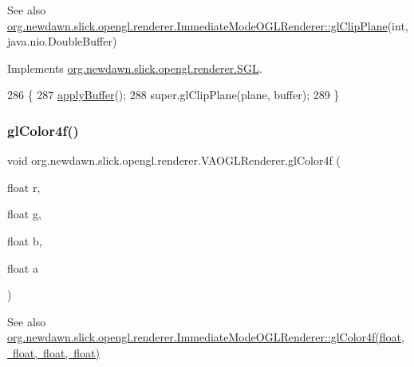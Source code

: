 \begin{DoxySeeAlso}{See also}
\mbox{\hyperlink{classorg_1_1newdawn_1_1slick_1_1opengl_1_1renderer_1_1_immediate_mode_o_g_l_renderer_ac015ad8c26e5718b1e27910c8f09673c}{org.\+newdawn.\+slick.\+opengl.\+renderer.\+Immediate\+Mode\+O\+G\+L\+Renderer\+::gl\+Clip\+Plane}}(int, java.\+nio.\+Double\+Buffer) 
\end{DoxySeeAlso}


Implements \mbox{\hyperlink{interfaceorg_1_1newdawn_1_1slick_1_1opengl_1_1renderer_1_1_s_g_l_aa0ecf8896be6f072c3d38372179071f8}{org.\+newdawn.\+slick.\+opengl.\+renderer.\+S\+GL}}.


\begin{DoxyCode}
286                                                             \{
287         \mbox{\hyperlink{classorg_1_1newdawn_1_1slick_1_1opengl_1_1renderer_1_1_v_a_o_g_l_renderer_a7c5d09419cd40761be8f849631aebab5}{applyBuffer}}();
288         super.glClipPlane(plane, buffer);
289     \}
\end{DoxyCode}
\mbox{\label{classorg_1_1newdawn_1_1slick_1_1opengl_1_1renderer_1_1_v_a_o_g_l_renderer_a9ab7945987d3cd40a9eff2d4506af44e}} 
\subsubsection{\texorpdfstring{gl\+Color4f()}{glColor4f()}}
{\footnotesize\ttfamily void org.\+newdawn.\+slick.\+opengl.\+renderer.\+V\+A\+O\+G\+L\+Renderer.\+gl\+Color4f (\begin{DoxyParamCaption}\item[{float}]{r,  }\item[{float}]{g,  }\item[{float}]{b,  }\item[{float}]{a }\end{DoxyParamCaption})\hspace{0.3cm}{\ttfamily [inline]}}

\begin{DoxySeeAlso}{See also}
\mbox{\hyperlink{classorg_1_1newdawn_1_1slick_1_1opengl_1_1renderer_1_1_immediate_mode_o_g_l_renderer_afad98c65defdaa9753efabd4e9747cb5}{org.\+newdawn.\+slick.\+opengl.\+renderer.\+Immediate\+Mode\+O\+G\+L\+Renderer\+::gl\+Color4f(float, float, float, float)}} 
\end{DoxySeeAlso}


